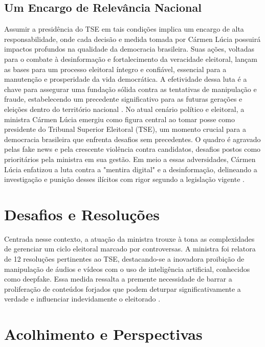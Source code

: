 \documentclass[
   article,       
   12pt,          
   oneside,       
   a4paper,       
   english,       
   brazil,        
   sumario=tradicional
   ]{abntex2}
\begin{document}
\subsection{Um Encargo de Relevância Nacional}
Assumir a presidência do TSE em tais condições implica um encargo de alta responsabilidade, onde cada decisão e medida tomada por Cármen Lúcia possuirá impactos profundos na qualidade da democracia brasileira. Suas ações, voltadas para o combate à desinformação e fortalecimento da veracidade eleitoral, lançam as bases para um processo eleitoral íntegro e confiável, essencial para a manutenção e prosperidade da vida democrática. A efetividade dessa luta é a chave para assegurar uma fundação sólida contra as tentativas de manipulação e fraude, estabelecendo um precedente significativo para as futuras gerações e eleições dentro do território nacional \cite{Quem_centraliza_poderes_em_uma_pessoa_chamase}.
No atual cenário político e eleitoral, a ministra Cármen Lúcia emergiu como figura central ao tomar posse como presidente do Tribunal Superior Eleitoral (TSE), um momento crucial para a democracia brasileira que enfrenta desafios sem precedentes. O quadro é agravado pelas fake news e pela crescente violência contra candidatos, desafios postos como prioritários pela ministra em sua gestão. Em meio a essas adversidades, Cármen Lúcia enfatizou a luta contra a "mentira digital" e a desinformação, delineando a investigação e punição desses ilícitos com rigor segundo a legislação vigente \cite{Carmen_Lucia_toma_posse_na_presidencia_do_TSE}.

\section{Desafios e Resoluções}

Centrada nesse contexto, a atuação da ministra trouxe à tona as complexidades de gerenciar um ciclo eleitoral marcado por controversas. A ministra foi relatora de 12 resoluções pertinentes ao TSE, destacando-se a inovadora proibição de manipulação de áudios e vídeos com o uso de inteligência artificial, conhecidos como deepfake. Essa medida ressalta a premente necessidade de barrar a proliferação de conteúdos forjados que podem deturpar significativamente a verdade e influenciar indevidamente o eleitorado \cite{Contra_o_virus_da_mentira_ha_o_remedio_da_inf}.

\section{Acolhimento e Perspectivas}
\end{document}
